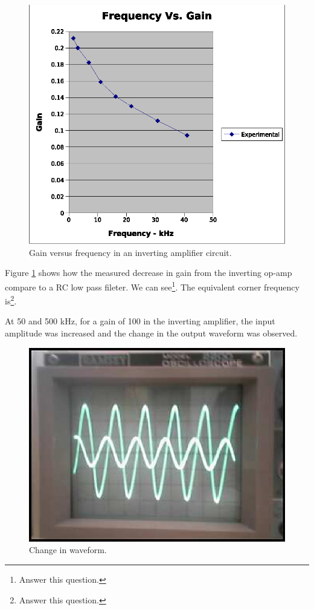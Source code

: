 \documentclass[11pt,onecolumn]{article}
\begin{document}
%
%
\begin{figure}
\center
\includegraphics{freq.eps}
\caption{Gain versus frequency in an inverting amplifier circuit.}\label{fig:freq}
\end{figure}

Figure \ref{fig:freq} shows how the measured decrease in gain from the inverting op-amp compare to a RC low pass fileter. We can see\footnote{Answer this question.}. The equivalent corner frequency is\footnote{Answer this question.}.

At 50 and 500 kHz, for a gain of 100 in the inverting amplifier, the input amplitude was increased and the change in the output waveform was observed.
\begin{figure}
\center
\includegraphics{sketch.eps}
\caption{Change in waveform.}\label{fig:sketch}
\end{figure}
\end{document}

